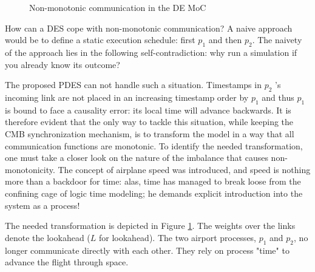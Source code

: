 \documentclass[11pt]{article}
\begin{document}
\begin{figure}[htpb]
\centering
{}
\caption{Non-monotonic communication in the DE MoC} 
\label{fig:nonmon}
\end{figure}

How can a DES cope with non-monotonic communication?
A naive approach would be to define a static execution schedule: first \(p_1\) and then \(p_2\).
The naivety of the approach lies in the following self-contradiction: why run a simulation if you already know its outcome?

The proposed PDES can not handle such a situation. 
Timestamps in \(p_2\) 's incoming link are not placed in an increasing timestamp order by \(p_1\) and thus \(p_1\) is bound to face a causality error: its local time will advance backwards.
It is therefore evident that the only way to tackle this situation, while keeping the CMB synchronization mechanism, is to transform the model in a way that all communication functions are monotonic.
To identify the needed transformation, one must take a closer look on the nature of the imbalance that causes non-monotonicity.
The concept of airplane speed was introduced, and speed is nothing more than a backdoor for time: 
alas, time has managed to break loose from the confining cage of logic time modeling; he demands explicit introduction into the system as a process!

The needed transformation is depicted in Figure \ref{fig:nonmon}. The weights over the links denote the lookahead (\(L\) for lookahead).
The two airport processes, \(p_1\) and \(p_2\), no longer communicate directly with each other.
They rely on process "time" to advance the flight through space.
\end{document}
